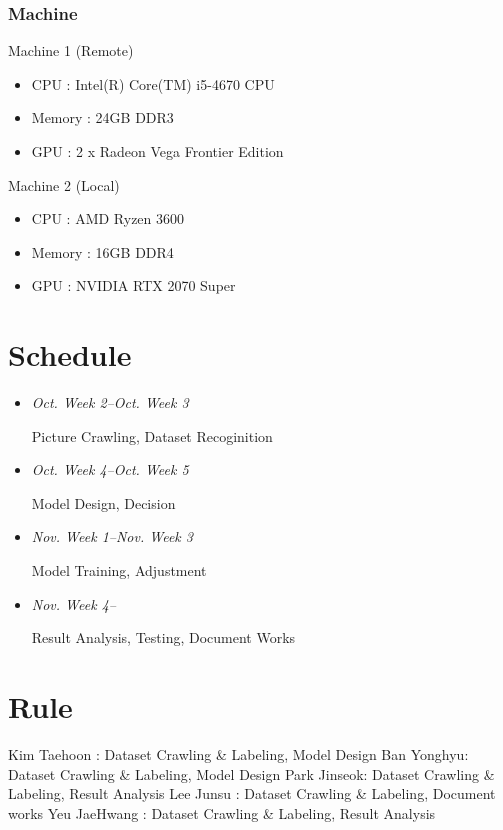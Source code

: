 \documentclass{article}
\begin{document}
\subsubsection{Machine}
Machine 1 (Remote)
\begin{itemize}
\item CPU : Intel(R) Core(TM) i5-4670 CPU
\item Memory : 24GB DDR3
\item GPU : 2 x Radeon Vega Frontier Edition
\end{itemize}

Machine 2 (Local)
\begin{itemize}
\item CPU : AMD Ryzen 3600
\item Memory : 16GB DDR4
\item GPU : NVIDIA RTX 2070 Super
\end{itemize}


\section{Schedule}
\begin{itemize}
\item \emph{Oct. Week 2--Oct. Week 3}

Picture Crawling, Dataset Recoginition
\item \emph{Oct. Week 4--Oct. Week 5}

Model Design, Decision
\item \emph{Nov. Week 1--Nov. Week 3}

Model Training, Adjustment
\item \emph{Nov. Week 4--}

Result Analysis, Testing, Document Works
\end{itemize}

\section{Rule}
Kim Taehoon : Dataset Crawling \& Labeling, Model Design \newline
Ban Yonghyu: Dataset Crawling \& Labeling, Model Design \newline
Park Jinseok: Dataset Crawling \& Labeling, Result Analysis \newline
Lee Junsu : Dataset Crawling \& Labeling, Document works \newline
Yeu JaeHwang : Dataset Crawling \& Labeling, Result Analysis \newline




\end{document}
